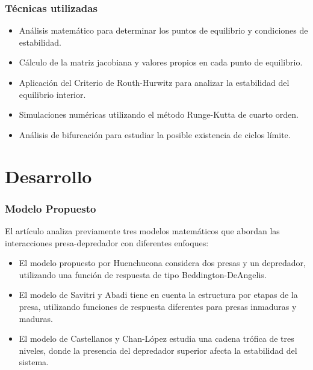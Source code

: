 \documentclass{beamer}
\begin{document}
\begin{frame}
	\frametitle{T\'ecnicas utilizadas}
	\begin{minipage}{10cm}
		\begin{itemize}
			\item Análisis matemático para determinar los puntos de equilibrio y condiciones de estabilidad.
			\item Cálculo de la matriz jacobiana y valores propios en cada punto de equilibrio.
			\item Aplicación del Criterio de Routh-Hurwitz
			para analizar la estabilidad del equilibrio interior.
			\item Simulaciones numéricas utilizando el método Runge-Kutta de
			cuarto orden.
			\item Análisis de bifurcación para estudiar la posible existencia de ciclos límite.
		\end{itemize} 
	\end{minipage}
\end{frame}	

\section{Desarrollo}
\begin{frame}
\frametitle{Modelo Propuesto}
\begin{minipage}{10cm}
	El artículo analiza previamente tres modelos matemáticos que abordan las interacciones presa-depredador con diferentes enfoques:
	\begin{itemize}
		\item El modelo propuesto por Huenchucona considera dos presas y un depredador, utilizando una función de respuesta de tipo Beddington-DeAngelis.
		\item  El modelo de Savitri y Abadi tiene en cuenta la estructura 
		por etapas de la presa, utilizando funciones de respuesta diferentes para presas inmaduras y maduras.
		\item El modelo de Castellanos y Chan-López estudia una cadena trófica de tres niveles, donde la presencia del depredador superior afecta la estabilidad del sistema.
	\end{itemize}
\end{minipage}
\end{frame}
\end{document}
